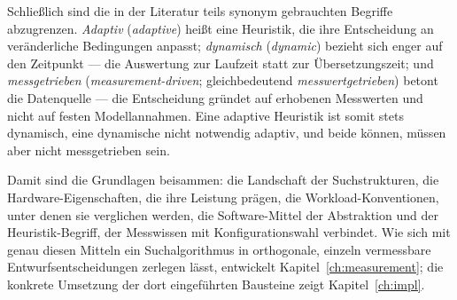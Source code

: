 Schließlich sind die in der Literatur teils synonym gebrauchten Begriffe abzugrenzen\@. \emph{Adaptiv}
(\emph{adaptive}) heißt eine Heuristik, die ihre Entscheidung an veränderliche Bedingungen anpasst;
\emph{dynamisch} (\emph{dynamic}) bezieht sich enger auf den Zeitpunkt --- die Auswertung zur Laufzeit
statt zur Übersetzungszeit; und \emph{messgetrieben} (\emph{measurement-driven}; gleichbedeutend
\emph{messwertgetrieben}) betont die Datenquelle --- die Entscheidung gründet auf erhobenen Messwerten
und nicht auf festen Modellannahmen. Eine adaptive Heuristik ist somit stets dynamisch, eine dynamische
nicht notwendig adaptiv, und beide können, müssen aber nicht messgetrieben sein.

\begin{nurlang}
Damit sind die Grundlagen beisammen: die Landschaft der Suchstrukturen, die Hardware-Eigenschaften, die
ihre Leistung prägen, die Workload-Konventionen, unter denen sie verglichen werden, die Software-Mittel
der Abstraktion und der Heuristik-Begriff, der Messwissen mit Konfigurationswahl verbindet. Wie sich mit
genau diesen Mitteln ein Suchalgorithmus in orthogonale, einzeln vermessbare Entwurfsentscheidungen
zerlegen lässt, entwickelt Kapitel~\ref{ch:measurement}; die konkrete Umsetzung der dort eingeführten
Bausteine zeigt Kapitel~\ref{ch:impl}.
\end{nurlang}
